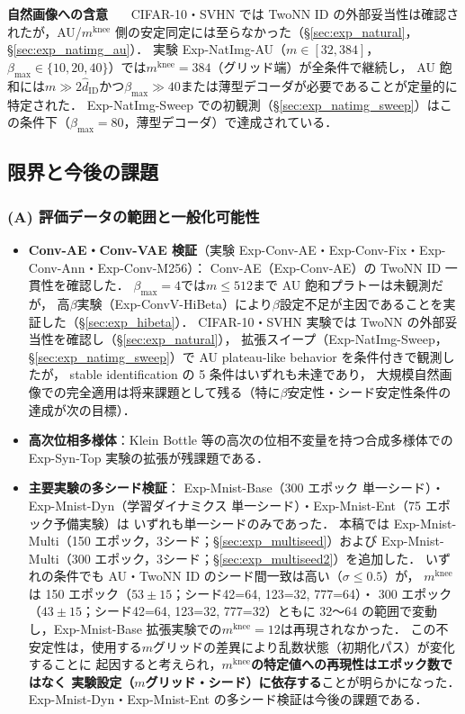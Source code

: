 \documentclass[11pt,a4paper]{jsarticle}
\newcommand{\mknee}{m^{\mathrm{knee}}}
\begin{document}
\textbf{自然画像への含意}~~~
CIFAR-10・SVHN では TwoNN ID の外部妥当性は確認されたが，AU/$\mknee$ 側の安定同定には至らなかった（§\ref{sec:exp_natural}，§\ref{sec:exp_natimg_au}）．
実験 Exp-NatImg-AU（$m \in [32, 384]$，$\beta_{\max} \in \{10,20,40\}$）では$\mknee = 384$（グリッド端）が全条件で継続し，
AU 飽和には$m \gg 2\hat{d}_\mathrm{ID}$かつ$\beta_{\max} \gg 40$または薄型デコーダが必要であることが定量的に特定された．
Exp-NatImg-Sweep での初観測（§\ref{sec:exp_natimg_sweep}）はこの条件下（$\beta_{\max}=80$，薄型デコーダ）で達成されている．

\subsection{限界と今後の課題}\label{sec:disc_limitation}

\subsubsection*{(A) 評価データの範囲と一般化可能性}

\begin{itemize}
  \item \textbf{Conv-AE・Conv-VAE 検証}（実験 Exp-Conv-AE・Exp-Conv-Fix・Exp-Conv-Ann・Exp-Conv-M256）：
        Conv-AE（Exp-Conv-AE）の TwoNN ID 一貫性を確認した．
        $\beta_{\max}=4$では$m \leq 512$まで AU 飽和プラトーは未観測だが，
        高$\beta$実験（Exp-ConvV-HiBeta）により$\beta$設定不足が主因であることを実証した（§\ref{sec:exp_hibeta}）．
        CIFAR-10・SVHN 実験では TwoNN の外部妥当性を確認し（§\ref{sec:exp_natural}），
        拡張スイープ（Exp-NatImg-Sweep，§\ref{sec:exp_natimg_sweep}）で AU plateau-like behavior を条件付きで観測したが，
        stable identification の 5 条件はいずれも未達であり，
        大規模自然画像での完全適用は将来課題として残る（特に$\beta$安定性・シード安定性条件の達成が次の目標）．
  \item \textbf{高次位相多様体}：Klein Bottle 等の高次の位相不変量を持つ合成多様体での
        Exp-Syn-Top 実験の拡張が残課題である．
  \item \textbf{主要実験の多シード検証}：
        Exp-Mnist-Base（300 エポック 単一シード）・Exp-Mnist-Dyn（学習ダイナミクス 単一シード）・Exp-Mnist-Ent（75 エポック予備実験）は
        いずれも単一シードのみであった．
        本稿では Exp-Mnist-Multi（150 エポック，3シード；§\ref{sec:exp_multiseed}）および
        Exp-Mnist-Multi（300 エポック，3シード；§\ref{sec:exp_multiseed2}）を追加した．
        いずれの条件でも AU・TwoNN ID のシード間一致は高い（$\sigma \leq 0.5$）が，
        $\mknee$は 150 エポック（$53 \pm 15$；シード42=64, 123=32, 777=64）・
        300 エポック（$43 \pm 15$；シード42=64, 123=32, 777=32）ともに
        32〜64 の範囲で変動し，Exp-Mnist-Base 拡張実験での$\mknee = 12$は再現されなかった．
        この不安定性は，使用する$m$グリッドの差異により乱数状態（初期化パス）が変化することに
        起因すると考えられ，\textbf{$\mknee$の特定値への再現性はエポック数ではなく
        実験設定（$m$グリッド・シード）に依存する}ことが明らかになった．
        Exp-Mnist-Dyn・Exp-Mnist-Ent の多シード検証は今後の課題である．
\end{itemize}
\end{document}
